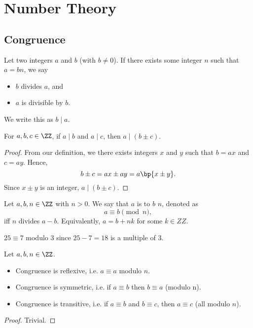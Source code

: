 \chapter{Number Theory}

\section{Congruence}

\begin{definition}
    Let two integers $a$ and $b$ (with $b \neq 0$). If there exists some integer $n$ such that $a = bn$, we say
    \begin{itemize}
        \item $b$ divides $a$, and
        \item $a$ is divisible by $b$.
    \end{itemize}
    We write this as $b \mid a$.
\end{definition}

\begin{proposition}
    For $a, b, c \in \ZZ$, if $a \mid b$ and $a \mid c$, then $a \mid (b \pm c)$.
\end{proposition}
\begin{proof}
    From our definition, we there exists integers $x$ and $y$ such that $b = ax$ and $c = ay$. Hence, \[b \pm c = ax \pm ay = a\bp{x \pm y}.\] Since $x \pm y$ is an integer, $a \mid (b \pm c)$.
\end{proof}

\begin{definition}
    Let $a, b, n \in \ZZ$ with $n > 0$. We say that $a$ is  to $b$  $n$, denoted as \[a \equiv b \pmod{n},\] iff $n$ divides $a - b$. Equivalently, $a = b + nk$ for some $k \in ZZ$.
\end{definition}

\begin{example}
    $25 \equiv 7$ modulo 3 since $25 - 7 = 18$ is a multiple of 3.
\end{example}

\begin{proposition}
    Let $a, b, n \in \ZZ$.
    \begin{itemize}
        \item Congruence is reflexive, i.e. $a \equiv a$ modulo $n$.
        \item Congruence is symmetric, i.e. if $a \equiv b$ then $b \equiv a$ (modulo n).
        \item Congruence is transitive, i.e. if $a \equiv b$ and $b \equiv c$, then $a \equiv c$ (all modulo $n$).
    \end{itemize}
\end{proposition}
\begin{proof}
    Trivial.
\end{proof}

